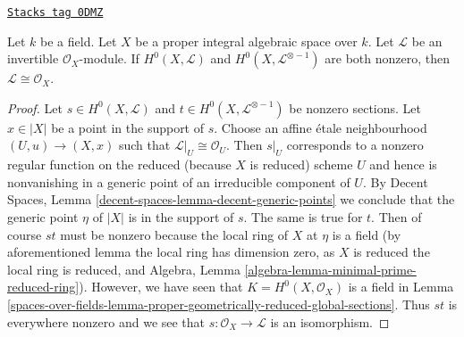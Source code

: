 \begin{lemma}
\label{spaces-over-fields-lemma-characterize-trivial-pic-integral}
\href{https://stacks.math.columbia.edu/tag/0DMZ}{\texttt{Stacks tag 0DMZ}}

Let $k$ be a field. Let $X$ be a proper integral algebraic space over $k$.
Let $\mathcal{L}$ be an invertible $\mathcal{O}_X$-module.
If $H^0(X, \mathcal{L})$ and $H^0(X, \mathcal{L}^{\otimes - 1})$
are both nonzero, then $\mathcal{L} \cong \mathcal{O}_X$.
\end{lemma}

\begin{proof}
Let $s \in H^0(X, \mathcal{L})$ and $t \in H^0(X, \mathcal{L}^{\otimes - 1})$
be nonzero sections. Let $x \in |X|$ be a point in the support of $s$.
Choose an affine \'etale neighbourhood $(U, u) \to (X, x)$ such that
$\mathcal{L}|_U \cong \mathcal{O}_U$. Then $s|_U$ corresponds to a nonzero
regular function on the reduced (because $X$ is reduced) scheme $U$ and hence
is nonvanishing in a generic point of an irreducible component of $U$. By
Decent Spaces, Lemma \ref{decent-spaces-lemma-decent-generic-points}
we conclude that the generic point $\eta$ of $|X|$ is in the support of $s$.
The same is true for $t$. Then of course $st$ must be nonzero because
the local ring of $X$ at $\eta$ is a field (by aforementioned lemma
the local ring has dimension zero, as $X$ is reduced the local ring is
reduced, and Algebra, Lemma \ref{algebra-lemma-minimal-prime-reduced-ring}).
However, we have seen that $K = H^0(X, \mathcal{O}_X)$
is a field in Lemma \ref{spaces-over-fields-lemma-proper-geometrically-reduced-global-sections}.
Thus $st$ is everywhere nonzero and we see that
$s : \mathcal{O}_X \to \mathcal{L}$ is an isomorphism.
\end{proof}


